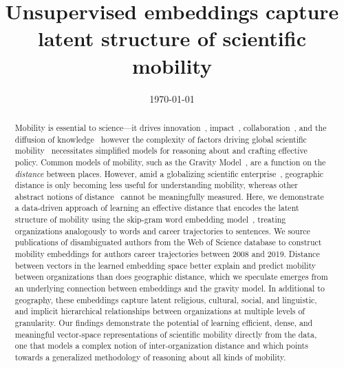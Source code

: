 \documentclass[12pt]{article} %
\begin{document}

\title{Unsupervised embeddings capture latent structure of scientific mobility} %
\date{\today}
\maketitle %

%
%

\begin{abstract}

Mobility is essential to science---it drives innovation~\autocite{braunerhjelm2020labor, kaiser2018innovation, armano2017innovation}, impact~\autocite{sugimoto2017mostimpact, petersen2018multiscale, jonkers2013return, franzoni2014advantage}, collaboration~\autocite{rodrigues2016mobility}, and the diffusion of knowledge~\autocite{braunerhjelm2020labor, azoulay2011diffusion, morgan2018prestige} however the complexity of factors driving global scientific mobility~\autocite{robinson2019mobility, vannoorden2012mobility, deville2014career, ackers2008mobility, scott2015dynamics} necessitates simplified models for reasoning about and crafting effective policy. 
Common models of mobility, such as the Gravity Model~\autocite{curiel2018citygravity, lewer2008immigrationgravity, jung2008highwaygravity, hong2016busgravity, truscott2012epidemicgravity, xia2005measlesgravity, simini2012universal}, are a function on the \textit{distance} between places.
However, amid a globalizing scientific enterprise~\autocite{czaika2018globalisation}, geographic distance is only becoming less useful for understanding mobility, whereas other abstract notions of distance~\autocite{boschma2005proximity} cannot be meaningfully measured.
Here, we demonstrate a data-driven approach of learning an effective distance that encodes the latent structure of mobility using the skip-gram word embedding model~\autocite{mikolov2013word2vec}, treating organizations analogously to words and career trajectories to sentences.
We source publications of disambiguated authors from the Web of Science database to construct mobility embeddings for authors career trajectories between 2008 and 2019. 
Distance between vectors in the learned embedding space better explain and predict mobility between organizations than does geographic distance, which we speculate emerges from an underlying connection between embeddings and the gravity model.
In additional to geography, these embeddings capture latent religious, cultural, social, and linguistic, and implicit hierarchical relationships between organizations at multiple levels of granularity.
Our findings demonstrate the potential of learning efficient, dense, and meaningful vector-space representations of scientific mobility directly from the data, one that models a complex notion of inter-organization distance and which points towards a generalized methodology of reasoning about all kinds of mobility. 

\end{abstract}
\end{document}
